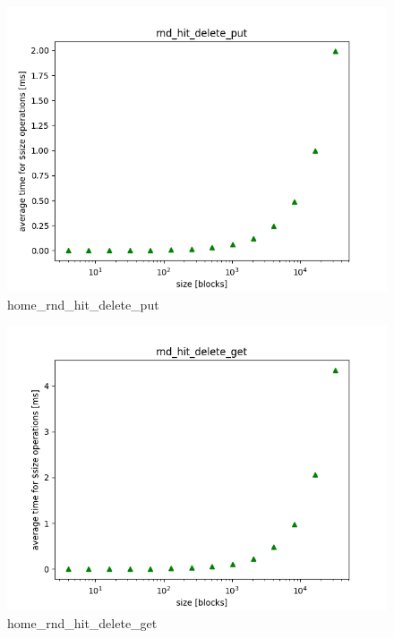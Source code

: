 \documentclass[twocolumn,11pt]{article}
\begin{document}
\begin{figure}[h!]
  \includegraphics[width=\linewidth]{Pictures/HOMEPC/rnd_hit_delete_complete_put.png}
  \caption{home\_rnd\_hit\_delete\_put}
  \label{fig:home_rnd_hit_delete_put}
\end{figure}
\begin{figure}[h!]
  \includegraphics[width=\linewidth]{Pictures/HOMEPC/rnd_hit_delete_complete_get.png}
  \caption{home\_rnd\_hit\_delete\_get}
  \label{fig:home_rnd_hit_delete_get}
\end{figure}
\end{document}

